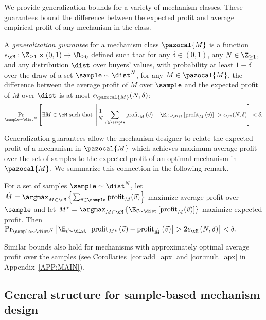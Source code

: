 We provide generalization bounds for a variety of mechanism classes. These guarantees bound the difference between the expected profit and average empirical profit of any mechanism in the class.

\begin{definition}\label{def:gen_guar}
A \emph{generalization guarantee} for a mechanism class $\pazocal{M}$ is a function $\epsilon_{\cM} : \Z_{\geq 1} \times (0,1) \to \R_{\geq 0}$ defined such that for any $\delta \in (0,1)$, any $N \in \Z_{\geq 1}$, and any distribution $\dist$ over buyers' values, with probability at least $1-\delta$ over the draw of a set $\sample \sim \dist^N$, for any $M \in \pazocal{M}$, the difference between the average profit of $M$ over $\sample$ and the expected profit of $M$ over $\dist$ is at most $\epsilon_{\pazocal{M}}(N, \delta)$:
\[\Pr_{\sample \sim \dist^N} \left[\exists M \in \cM \text{ such that } \left|\frac{1}{N}\sum_{\vec{v} \in \sample} \profit_M\left(\vec{v}\right) - \E_{\vec{v} \sim \dist}\left[\profit_M\left(\vec{v}\right)\right]\right| > \epsilon_{\cM}(N, \delta) \right] < \delta.\]\end{definition} 


Generalization guarantees allow the mechanism designer to relate the expected profit of a mechanism in $\pazocal{M}$ which achieves maximum average profit over the set of samples to the expected profit of an optimal mechanism in $\pazocal{M}$. We summarize this connection in the following remark.

\begin{remark}\label{rem:opt}
For a set of samples $\sample \sim \dist^N$, let $\hat{M} = \argmax_{M \in \cM}\left\{\sum_{\vec{v} \in \sample} \profit_M(\vec{v})\right\}$ maximize average profit over $\sample$ and let $M^* = \argmax_{M \in \cM}\left\{\E_{\vec{v} \sim \dist}\left[\profit_M(\vec{v})\right]\right\}$ maximize expected profit. Then $\Pr_{\sample \sim \dist^N} \left[\E_{\vec{v} \sim \dist}\left[\profit_{M^*}\left(\vec{v}\right) - \profit_{\hat{M}}\left(\vec{v}\right)\right] > 2\epsilon_{\cM}\left(N, \delta\right)\right] < \delta.$
\end{remark}



Similar bounds also hold for mechanisms with approximately optimal average profit over the samples (see Corollaries~\ref{cor:add_apx} and \ref{cor:mult_apx} in Appendix~\ref{APP:MAIN}).

\subsection{General structure for sample-based mechanism design}

